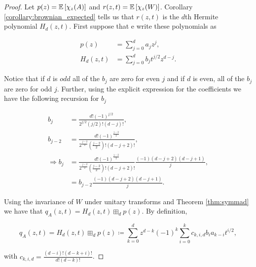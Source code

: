     \begin{proof}
        
        Let $p(z) = \mathbb E \left[  \chi_z(A)  \right]$ and $r(z,t) = \mathbb E \left[  \chi_z(W)  \right]$. Corollary \ref{corollary:brownian_expected} tells us that $r(z,t)$ is the $d$th Hermite polynomial $H_d(z,t)$. First suppose that e write these polynomials as

        \begin{align*}
            p(z)     &= \sum_{j=0}^d a_j z^j,\\ 
            H_d(z,t) &= \sum_{j=0}^d b_j t^{j/2} z^{d-j}.
        \end{align*}
        
        Notice that if $d$ is $odd$ all of the $b_j$ are zero for even $j$  and if $d$ is even, all of the $b_j$ are zero for odd $j$. Further, using the explicit expression for the coefficients we have the following recursion for $b_j$

        \begin{align}
            b_{j} &= \frac{d! (-1)^{j/2}}{2^{j/2} (j/2)! (d-j)!},\\ 
            b_{j-2} &= \frac{d! (-1)^{\frac{j-2}{2}}}{2^{\frac{j-2}{2}} \left(\frac{j-2}{2}\right)! (d-j+2)!},\\ 
            \Rightarrow b_{j} &= \frac{d! (-1)^{\frac{j-2}{2}}}{2^{\frac{j-2}{2}} \left(\frac{j-2}{2}\right)! (d-j+2)!} \frac{(-1)(d-j+2)(d-j+1)}{j},\\  
            &= b_{j-2} \frac{(-1)(d-j+2)(d-j+1)}{j}. \label{eq:hermite_coef_recurr}
        \end{align}

        Using the invariance of $W$ under unitary transforms and Theorem \ref{thm:symmad} we have that $q_A(z,t) = H_d(z,t) \boxplus_d p(z)$. By definition, 

        \begin{equation*}
            q_A(z,t) = H_d(z,t) \boxplus_d p(z) \coloneqq \sum_{k=0}^d z^{d-k}(-1)^k \sum_{i=0}^k c_{k,i,d} b_i a_{k-i} t^{i/2},
        \end{equation*} 

        \noindent with $c_{k,i,d} = \frac{(d-i)!(d-k+i)!}{d!(d-k)!}$.




\end{proof}
